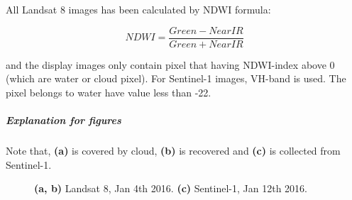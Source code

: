 All Landsat 8 images has been calculated by NDWI formula:

\begin{equation}
NDWI = \frac{Green - Near IR}{Green + Near IR}
\end{equation}

and the display images only contain pixel that having NDWI-index above 0 (which are water or cloud pixel). For Sentinel-1 images, VH-band is used. The pixel belongs to water have value less than -22.

\subparagraph{Explanation for figures} Note that, \textbf{(a)} is covered by cloud, \textbf{(b)} is recovered and \textbf{(c)} is collected from Sentinel-1. 

\begin{figure}[]
	\centering
	\centering
	\caption{
		\textbf{(a, b)} Landsat 8, Jan 4th 2016.
		\textbf{(c)} Sentinel-1, Jan 12th 2016.}
\end{figure}


